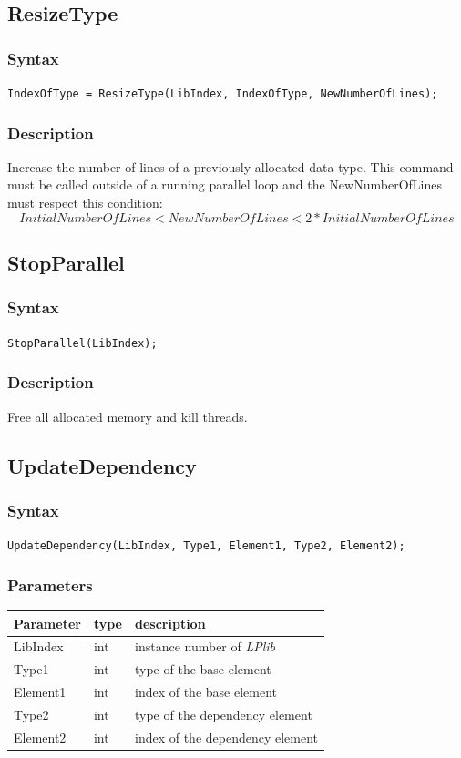 \documentclass[a4paper,12pt]{article}
\begin{document}
\subsection{ResizeType}

\subsubsection*{Syntax}
\tt{IndexOfType = ResizeType(LibIndex, IndexOfType, NewNumberOfLines);}
\normalfont

\subsubsection*{Description}
Increase the number of lines of a previously allocated data type. This command must be called outside of a running parallel loop and the NewNumberOfLines must respect this condition: $$ InitialNumberOfLines < NewNumberOfLines < 2*InitialNumberOfLines $$


\subsection{StopParallel}

\subsubsection*{Syntax}
\tt{StopParallel(LibIndex);}
\normalfont

\subsubsection*{Description}
Free all allocated memory and kill threads.


\subsection{UpdateDependency}

\subsubsection*{Syntax}
\tt{UpdateDependency(LibIndex, Type1, Element1, Type2, Element2);}
\normalfont

\subsubsection*{Parameters}

\begin{tabular}{|m{2cm}|m{1.5cm}|m{10.5cm}|}
\hline
Parameter  & type   & description \\
\hline
LibIndex   & int    & instance number of \emph{LPlib} \\
\hline
Type1      & int    & type of the base element \\
\hline
Element1   & int    & index of the base element \\
\hline
Type2      & int    & type of the dependency element \\
\hline
Element2   & int    & index of the dependency element \\
\hline
\end{tabular}
\end{document}

